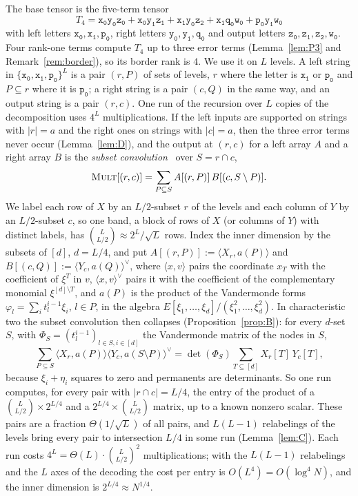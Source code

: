 \documentclass[11pt]{article}
\theoremstyle{definition}
\theoremstyle{remark}
\newcommand{\Mult}{\textnormal{\textsc{Mult}}}
\newcommand{\tl}[1]{\mathtt{#1}}
\begin{document}
The base tensor is the five-term tensor
\[
T_4=\tl{x_0}\tl{y_0}\tl{z_0}+\tl{x_0}\tl{y_1}\tl{z_1}+\tl{x_1}\tl{y_0}\tl{z_2}+\tl{x_1}\tl{q_0}\tl{w_0}+\tl{p_0}\tl{y_1}\tl{w_0}
\]
with left letters $\tl{x_0},\tl{x_1},\tl{p_0}$, right letters $\tl{y_0},\tl{y_1},\tl{q_0}$ and output letters $\tl{z_0},\tl{z_1},\tl{z_2},\tl{w_0}$. Four rank-one terms compute $T_4$ up to three error terms (Lemma~\ref{lem:P3} and Remark~\ref{rem:border}), so its border rank is $4$. We use it on $L$ levels. A left string in $\{\tl{x_0},\tl{x_1},\tl{p_0}\}^L$ is a pair $(r,P)$ of sets of levels, $r$ where the letter is $\tl{x_1}$ or $\tl{p_0}$ and $P\subseteq r$ where it is $\tl{p_0}$; a right string is a pair $(c,Q)$ in the same way, and an output string is a pair $(r,c)$. One run of the recursion over $L$ copies of the decomposition uses $4^L$ multiplications. If the left inputs are supported on strings with $|r|=a$ and the right ones on strings with $|c|=a$, then the three error terms never occur (Lemma~\ref{lem:D}), and the output at $(r,c)$ for a left array $A$ and a right array $B$ is the \emph{subset convolution}~\cite{BHKK07} over $S=r\cap c$,
\[
\Mult[(r,c)]=\sum_{P\subseteq S}A[(r,P)]\,B[(c,S\setminus P)].
\]
We label each row of $X$ by an $L/2$-subset $r$ of the levels and each column of $Y$ by an $L/2$-subset $c$, so one band, a block of rows of $X$ (or columns of $Y$) with distinct labels, has $\binom L{L/2}\approx2^L/\sqrt L$ rows. Index the inner dimension by the subsets of $[d]$, $d=L/4$, and put $A[(r,P)]:=\langle X_r,a(P)\rangle$ and $B[(c,Q)]:=\langle Y_c,a(Q)\rangle^\vee$, where $\langle x,v\rangle$ pairs the coordinate $x_T$ with the coefficient of $\xi^T$ in $v$, $\langle x,v\rangle^\vee$ pairs it with the coefficient of the complementary monomial $\xi^{[d]\setminus T}$, and $a(P)$ is the product of the Vandermonde forms $\varphi_l=\sum_it_l^{i-1}\xi_i$, $l\in P$, in the algebra $E[\xi_1,\dots,\xi_d]/(\xi_1^2,\dots,\xi_d^2)$. In characteristic two the subset convolution then collapses (Proposition~\ref{prop:B}): for every $d$-set $S$, with $\Phi_S=(t_l^{i-1})_{l\in S,i\in[d]}$ the Vandermonde matrix of the nodes in $S$,
\[
\sum_{P\subseteq S}\langle X_r,a(P)\rangle\langle Y_c,a(S\setminus P)\rangle^\vee=\det(\Phi_S)\sum_{T\subseteq[d]}X_r[T]\,Y_c[T],
\]
because $\xi_i+\eta_i$ squares to zero and permanents are determinants. So one run computes, for every pair with $|r\cap c|=L/4$, the entry of the product of a $\binom L{L/2}\times2^{L/4}$ and a $2^{L/4}\times\binom L{L/2}$ matrix, up to a known nonzero scalar. These pairs are a fraction $\Theta(1/\sqrt L)$ of all pairs, and $L(L-1)$ relabelings of the levels bring every pair to intersection $L/4$ in some run (Lemma~\ref{lem:C}). Each run costs $4^L=\Theta(L)\cdot\binom L{L/2}^2$ multiplications; with the $L(L-1)$ relabelings and the $L$ axes of the decoding the cost per entry is $O(L^4)=O(\log^4N)$, and the inner dimension is $2^{L/4}\approx N^{1/4}$.
\end{document}
